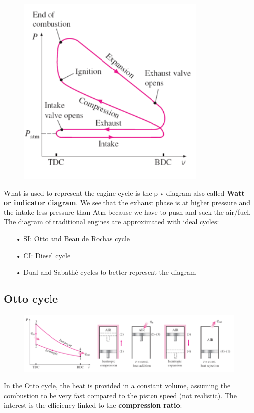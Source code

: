 	\begin{figure}
	\vspace{-5mm}
	\includegraphics[scale=0.6]{ch2/10}
	\label{fig:2.10}
	\end{figure} 
	What is used to represent the engine cycle is the p-v diagram also called \textbf{Watt or indicator diagram}. We see that the exhaust phase is at higher pressure and the intake less pressure than Atm because we have to push and suck the air/fuel. The diagram of traditional engines are approximated with ideal cycles:\\ 
	
	\begin{itemize}
	\item[•] SI: Otto and Beau de Rochas cycle
	\item[•] CI: Diesel cycle
	\item[•] Dual and Sabathé cycles to better represent the diagram
	\end{itemize}
	
	
\subsection{Otto cycle}
	
	\begin{figure}
	\vspace{-5mm}
	\includegraphics[scale=0.55]{ch2/11}
	\label{fig:2.11}
	\end{figure}
	In the Otto cycle, the heat is provided in a constant volume, assuming the combustion to be very fast compared to the piston speed (not realistic). The interest is the efficiency linked to the \textbf{compression ratio}:
	
